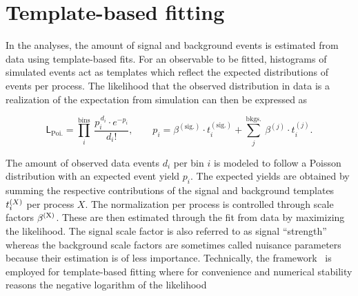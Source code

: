 

\section{Template-based fitting}

In the analyses, the amount of signal and background events is estimated from data using template-based  fits. For an observable to be fitted, histograms of simulated events act as templates which reflect the expected distributions of events per process. The likelihood that the observed distribution in data is a realization of the expectation from simulation can then be expressed as

\begin{equation}
\mathsf{L}_\mathrm{Poi.}=\prod_{i}^\mathrm{bins}~\frac{p_{i}^{\,d_{i}}\cdot e^{-p_{i}}}{d_{i}!},\qquad p_{i}=\beta^{\mathrm{(sig.)}}\cdot t^{\mathrm{(sig.)}}_{i}+\sum_{j}^\mathrm{bkgs.}~\beta^{(j)}\cdot t^{(j)}_{i}. \label{eq:technique-likelihood}
\end{equation}

The amount of observed data events $d_{i}$ per bin $i$ is modeled to follow a Poisson distribution with an expected event yield $p_{i}$. The expected yields are obtained by summing the respective contributions of the signal and background templates $t^\scriptn{(X)}_{i}$ per process $X$. The normalization per process is controlled through scale factors $\beta^\scriptn{\mathrm{(X)}}$. These are then estimated through the fit from data by maximizing the likelihood. The signal scale factor is also referred to as signal ``strength'' whereas the background scale factors are sometimes called nuisance parameters because their estimation is of less importance. Technically, the \THETA framework~\cite{theta} is employed for template-based fitting where for convenience and numerical stability reasons the negative logarithm of the likelihood

